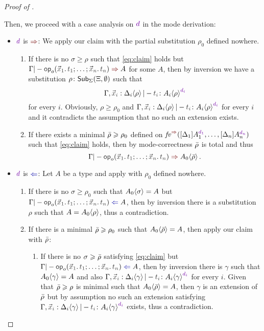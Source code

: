 \begin{proof}[Proof of {}]
\begin{itemize}
      Then, we proceed with a case analysis on $\dir{d}$ in the mode derivation:
      \begin{itemize}
        \item $\dir{d}$ is $\syn$: We apply our claim with the partial substitution $\rho_0$ defined nowhere.
          \begin{enumerate}
            \item If there is no $\sigma \geq \rho$ such that \eqref{eq:claim} holds but $\Gamma |- \tmOpts \syn A$ for some $A$, then by inversion we have a substitution $\rho\colon \mathsf{Sub}_{\Sigma}(\Xi,\emptyset)$ such that
              \[
                \Gamma, \vars{x}_\isTerm{i} : \simsub{\Delta_i}{\rho} |- \isTerm{t_i} \colon \simsub{A_i}{\rho}^{\dir{d_i}}
              \]
              for every $i$.
              Obviously, $\rho \geq \rho_0$ and ${\Gamma, \vars{x}_\isTerm{i} : \simsub{\Delta_i}{\rho} |- \isTerm{t_i} \colon \simsub{A_i}{\rho}^{\dir{d_i}}}$ for every $i$ and it contradicts the assumption that no such an extension exists.

            \item If there exists a minimal $\bar{\rho} \geqslant \rho_0$ defined on $\synvar(\biargs)$ such that \eqref{eq:claim} holds, then by mode-correctness $\bar{\rho}$ is total and thus
              \[
                \Gamma |- \tmOpts \syn \simsub{A_0}{\ext{\rho}}.
              \]
          \end{enumerate}

        \item $\dir{d}$ is $\chk$: Let $A$ be a type and apply  with $\rho_0$ defined nowhere.
          \begin{enumerate}
            \item If there is no $\sigma \geq \rho_0$ such that ${A_0}\!\left<{\sigma}\right> = A$ but $\Gamma |- \tmOpts \chk A$, then by inversion there is a substitution $\rho$ such that $A = {A_0}\!\left<{\rho}\right>$, thus a contradiction.
            \item If there is a minimal $\bar{\rho} \geqslant \rho_0$ such that ${A_0}\!\left<{\bar{\rho}}\right> = A$, then apply our claim with $\bar{\rho}$:
              \begin{enumerate}
                \item If there is no $\sigma \geqslant \bar{\rho}$ satisfying \eqref{eq:claim} but $\Gamma |- \tmOpts \chk A$, then by inversion there is $\gamma$ such that ${A_0}\!\left<{\gamma}\right> = A$ and also ${\Gamma, \vars{x}_\isTerm{i} : \simsub{\Delta_i}{\gamma} |- \isTerm{t_i} \colon \simsub{A_i}{\gamma}^{\dir{d_i}}}$ for every $i$.
                  Given that $\bar{\rho} \geqslant \rho$ is minimal such that ${A_0}\!\left<{\bar{\rho}}\right> = A$, then $\gamma$ is an extension of $\bar{\rho}$ but by assumption no such an extension satisfying ${\Gamma, \vars{x}_\isTerm{i} : \simsub{\Delta_i}{\gamma} |- \isTerm{t_i} \colon \simsub{A_i}{\gamma}^{\dir{d_i}}}$ exists, thus a contradiction.
                

\end{enumerate}
\end{enumerate}
\end{itemize}
\end{itemize}
\end{proof}

